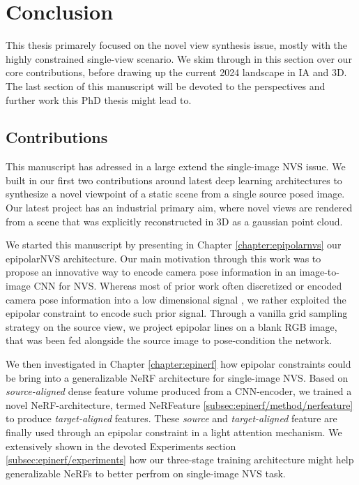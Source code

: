 \chapter{Conclusion}
\label{chapter:conclusion}

{}


This thesis primarely focused on the novel view synthesis issue, mostly with the highly constrained single-view scenario. We skim through in this section over our core contributions, before drawing up  the current 2024 landscape in \ac{IA} and 3D. The last section of this manuscript will be devoted to the perspectives and further work this PhD thesis might lead to. 

\section{Contributions}

This manuscript has adressed in a large extend the single-image \ac{NVS} issue. We built in our first two contributions around latest deep learning architectures to synthesize a novel viewpoint of a static scene from a single source posed image. Our latest project has an industrial primary aim, where novel views are rendered from a scene that was explicitly reconstructed in 3D as a gaussian point cloud.

We started this manuscript by presenting in Chapter \ref{chapter:epipolarnvs} our epipolarNVS architecture. Our main motivation through this work was to propose an innovative way to encode camera pose information in an image-to-image \ac{CNN} for \ac{NVS}. Whereas most of prior work often discretized \citep{kim2020novel} or encoded camera pose information into a low dimensional signal \citep{sun2018multiview}, we rather exploited the epipolar constraint to encode such prior signal. Through a vanilla grid sampling strategy on the source view, we project epipolar lines on a blank RGB image, that was been fed alongside the source image to pose-condition the network. 

We then investigated in Chapter \ref{chapter:epinerf} how epipolar constraints could be bring into a generalizable \ac{NeRF} architecture for single-image \ac{NVS}. Based on \textit{source-aligned} dense feature volume produced from a CNN-encoder, we trained a novel \ac{NeRF}-architecture, termed NeRFeature \ref{subsec:epinerf/method/nerfeature} to produce \textit{target-aligned} features. These \textit{source} and \textit{target-aligned} feature are finally used through an epipolar constraint in a light attention mechanism. We extensively shown in the devoted Experiments section \ref{subsec:epinerf/experiments} how our three-stage training architecture might help generalizable \ac{NeRF}s to better perfrom on single-image \ac{NVS} task.  

